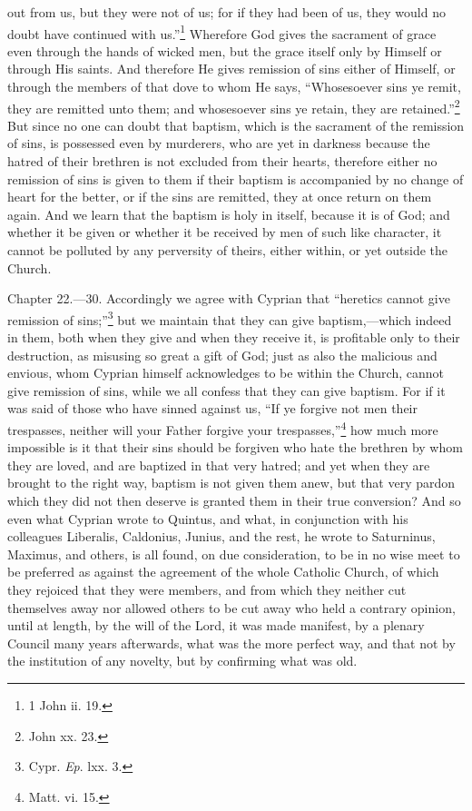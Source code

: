 out from us, but they were not of us; for if they had been of us, they would no doubt have continued with us.''\footnote{\par  1 John ii. 19.} Wherefore God gives the sacrament of grace even through the hands of wicked men, but the grace itself only by Himself or through His saints. And therefore He gives remission of sins either of Himself, or through the members of that dove to whom He says, ``Whosesoever sins ye remit, they are remitted unto them; and whosesoever sins ye retain, they are retained.''\footnote{\par  John xx. 23.} But since no one can doubt that baptism, which is the sacrament of the remission of sins, is possessed even by murderers, who are yet in darkness because the hatred of their brethren is not excluded from their hearts, therefore either no remission of sins is given to them if their baptism is accompanied by no change of heart for the better, or if the sins are remitted, they at once return on them again. And we learn that the baptism is holy in itself, because it is of God; and whether it be given or whether it be received by men of such like character, it cannot be polluted by any perversity of theirs, either within, or yet outside the Church.


Chapter 22.—30. Accordingly we agree with Cyprian that ``heretics cannot give remission of sins;''\footnote{\par  Cypr. \emph{Ep}. lxx. 3.} but we maintain that they can give baptism,—which indeed in them, both when they give and when they receive it, is profitable only to their destruction, as misusing so great a gift of God; just as also the malicious and envious, whom Cyprian himself acknowledges to be within the Church, cannot give remission of sins, while we all confess that they can give baptism. For if it was said of those who have sinned against us, ``If ye forgive not men their trespasses, neither will your Father forgive your trespasses,''\footnote{\par  Matt. vi. 15.} how much more impossible is it that their sins should be forgiven who hate the brethren by whom they are loved, and are baptized in that very hatred; and yet when they are brought to the right way, baptism is not given them anew, but that very pardon which they did not then deserve is granted them in their true conversion? And so even what Cyprian wrote to Quintus, and what, in conjunction with his colleagues Liberalis, Caldonius, Junius, and the rest, he wrote to Saturninus, Maximus, and others, is all found, on due consideration, to be in no wise meet to be preferred as against the agreement of the whole Catholic Church, of which they rejoiced that they were members, and from which they neither cut themselves away nor allowed others to be cut away who held a contrary opinion, until at length, by the will of the Lord, it was made manifest, by a plenary Council many years afterwards, what was the more perfect way, and that not by the institution of any novelty, but by confirming what was old.

